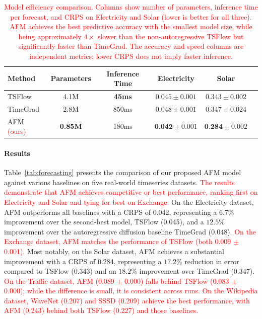 \documentclass[a4paper,10pt,twocolumn,preprint,3p]{elsarticle}
\begin{document}
\begin{table}[htbp]
  \centering
  \caption{\textcolor{red}{Model efficiency comparison. Columns show number of parameters, inference time per forecast, and CRPS on Electricity and Solar (lower is better for all three). AFM achieves the best predictive accuracy with the smallest model size, while being approximately $4\times$ slower than the non-autoregressive TSFlow but significantly faster than TimeGrad. The accuracy and speed columns are independent metrics; lower CRPS does not imply faster inference.}}
  \label{tab:efficiency}
\begin{small}
  \begin{tabular}{lccccc}
    \toprule
    Method & Parameters & Inference Time & Electricity & Solar \\
    \midrule
    TSFlow   & \phantom{0}4.1M & \phantom{0}\textbf{45ms}  & $0.045 \pm 0.001$ & $0.343 \pm 0.002$ \\
    TimeGrad & \phantom{0}2.8M & 850ms & $0.048 \pm 0.001$ & $0.347 \pm 0.024$ \\
    AFM \textcolor{red}{(ours)} & \textbf{0.85M} & 180ms & $\textbf{0.042} \pm 0.001$ & $\textbf{0.284} \pm 0.002$ \\
    \bottomrule
  \end{tabular}
  \end{small}
\end{table}

\paragraph{Results}
Table~\ref{tab:forecasting} presents the comparison of our proposed AFM model against various baselines on five real-world timeseries datasets. \textcolor{red}{The results demonstrate that AFM achieves competitive or best performance, ranking first on Electricity and Solar and tying for best on Exchange.} On the Electricity dataset, AFM outperforms all baselines with a CRPS of 0.042, representing a $6.7\%$ improvement over the second-best model, TSFlow (0.045), and a $12.5\%$ improvement over the autoregressive diffusion baseline TimeGrad (0.048). \textcolor{red}{On the Exchange dataset, AFM matches the performance of TSFlow (both 0.009 $\pm$ 0.001).} Most notably, on the Solar dataset, AFM achieves a substantial improvement with a CRPS of 0.284, representing a $17.2\%$ reduction in error compared to TSFlow (0.343) and an $18.2\%$ improvement over TimeGrad (0.347). \textcolor{red}{On the Traffic dataset, AFM (0.089 $\pm$ 0.000) falls behind TSFlow (0.083 $\pm$ 0.000); while the difference is small, it is consistent across runs. On the Wikipedia dataset, WaveNet (0.207) and SSSD (0.209) achieve the best performance, with AFM (0.243) behind both TSFlow (0.227) and those baselines.}
\end{document}
